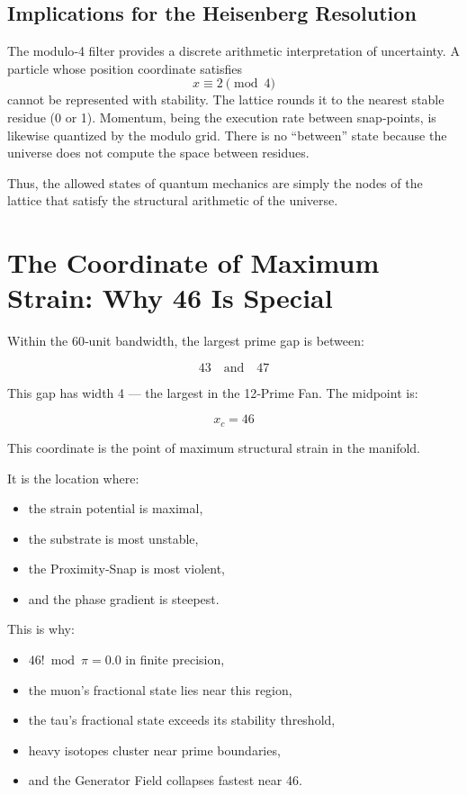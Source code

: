 \documentclass[reprint,amsmath,amssymb,aps,prl,floatfix]{revtex4-2}
\begin{document}
\begin{itemize}
\subsection{Implications for the Heisenberg Resolution}

The modulo‑4 filter provides a discrete arithmetic interpretation of uncertainty. A particle whose position coordinate satisfies  
\[
x \equiv 2 \pmod{4}
\]  
cannot be represented with stability. The lattice rounds it to the nearest stable residue (0 or 1). Momentum, being the execution rate between snap‑points, is likewise quantized by the modulo grid. There is no “between” state because the universe does not compute the space between residues.
\medskip

Thus, the allowed states of quantum mechanics are simply the nodes of the lattice that satisfy the structural arithmetic of the universe.

\section{The Coordinate of Maximum Strain: Why 46 Is Special}

Within the 60‑unit bandwidth, the largest prime gap is between:
\medskip

\[
43 \quad \text{and} \quad 47
\]
\medskip

This gap has width 4 — the largest in the 12‑Prime Fan.  
The midpoint is:
\medskip

\[
x_c = 46
\]

This coordinate is the point of maximum structural strain in the manifold.
\medskip

It is the location where:
\begin{itemize}
\item the strain potential is maximal,  
\item the substrate is most unstable,  
\item the Proximity‑Snap is most violent,  
\item and the phase gradient is steepest.
\end{itemize}
\medskip

This is why:
\begin{itemize}
\item \(46! \bmod \pi = 0.0\) in finite precision,  
\item the muon’s fractional state lies near this region,  
\item the tau’s fractional state exceeds its stability threshold,  
\item heavy isotopes cluster near prime boundaries,  
\item and the Generator Field collapses fastest near 46.
\end{itemize}
\medskip
\medskip


\end{itemize}
\end{document}
